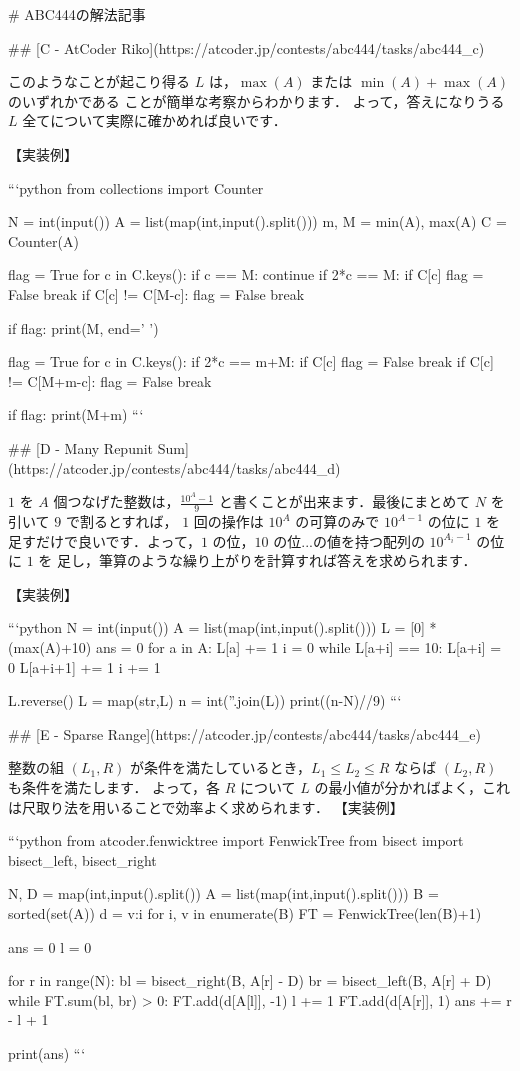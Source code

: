 # ABC444の解法記事

## [C - AtCoder Riko](https://atcoder.jp/contests/abc444/tasks/abc444_c)

このようなことが起こり得る $L$ は，$\max(A)$ または $\min(A) + \max(A)$ のいずれかである
ことが簡単な考察からわかります．
よって，答えになりうる $L$ 全てについて実際に確かめれば良いです．

【実装例】

```python
from collections import Counter

N = int(input())
A = list(map(int,input().split()))
m, M = min(A), max(A)
C = Counter(A)

flag = True
for c in C.keys():
    if c == M:
        continue
    if 2*c == M:
        if C[c] %
            flag = False
            break
    if C[c] != C[M-c]:
        flag = False
        break

if flag:
    print(M, end=' ')

flag = True
for c in C.keys():
    if 2*c == m+M:
        if C[c] %
            flag = False
            break
    if C[c] != C[M+m-c]:
        flag = False
        break

if flag:
    print(M+m)
```

## [D - Many Repunit Sum](https://atcoder.jp/contests/abc444/tasks/abc444_d)

$1$ を $A$ 個つなげた整数は，$\frac{10^A-1}{9}$ と書くことが出来ます．最後にまとめて $N$ を引いて $9$ で割るとすれば，
$1$ 回の操作は $10^A$ の可算のみで $10^{A-1}$ の位に $1$ を足すだけで良いです．よって，$1$ の位，$10$ の位...の値を持つ配列の $10^{A_i-1}$ の位に $1$ を
足し，筆算のような繰り上がりを計算すれば答えを求められます．

【実装例】

```python
N = int(input())
A = list(map(int,input().split()))
L = [0] * (max(A)+10)
ans = 0
for a in A:
    L[a] += 1
    i = 0
    while L[a+i] == 10:
        L[a+i] = 0
        L[a+i+1] += 1
        i += 1

L.reverse()
L = map(str,L)
n = int(''.join(L))
print((n-N)//9)
```

## [E - Sparse Range](https://atcoder.jp/contests/abc444/tasks/abc444_e)

整数の組 $(L_1, R)$ が条件を満たしているとき，$L_1 \le L_2 \le R$ ならば $(L_2, R)$ も条件を満たします．
よって，各 $R$ について $L$ の最小値が分かればよく，これは尺取り法を用いることで効率よく求められます．
【実装例】

```python
from atcoder.fenwicktree import FenwickTree
from bisect import bisect_left, bisect_right

N, D = map(int,input().split())
A = list(map(int,input().split()))
B = sorted(set(A))
d = {v:i for i, v in enumerate(B)}
FT = FenwickTree(len(B)+1)

ans = 0
l = 0

for r in range(N):
    bl = bisect_right(B, A[r] - D)
    br = bisect_left(B, A[r] + D)
    while FT.sum(bl, br) > 0:
        FT.add(d[A[l]], -1)
        l += 1
    FT.add(d[A[r]], 1)
    ans += r - l + 1

print(ans)
```
